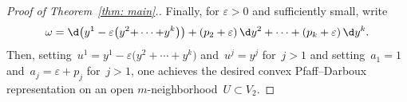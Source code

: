 \begin{proof}[Proof of Theorem~\ref{thm: main}.]
Finally, for $\varepsilon>0$ and sufficiently small, write
\[
\omega = \d\bigl(y^1-\varepsilon\big(y^2{+}\cdots{+}y^k\big)\bigr)
   + (p_2 + \varepsilon)\,\d y^2
   + \cdots + (p_k + \varepsilon)\,\d y^k.
\]
Then, setting~$u^1 = y^1-\varepsilon\big(y^2+\cdots+y^k\big)$ and~$u^j = y^j$
for~$j>1$ and setting~$a_1 = 1$ and~${a_j = \varepsilon + p_j}$ for~$j>1$,
one achieves the desired convex Pfaff--Darboux representation
on an open $m$-neigh\-bor\-hood~$U\subset V_2$.
\end{proof}
